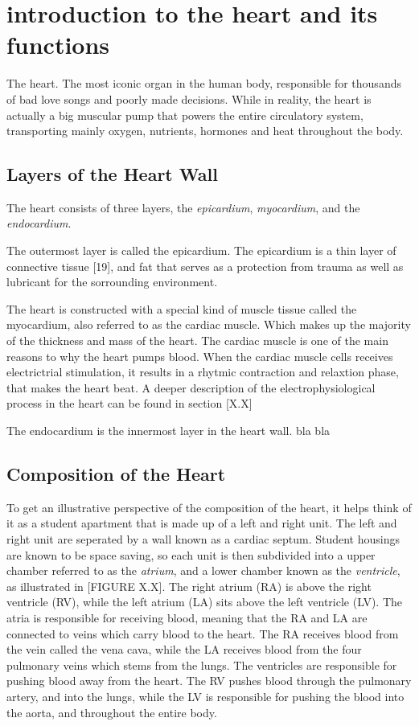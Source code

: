 \section{introduction to the heart and its functions}
The heart. The most iconic organ in the human body, responsible for thousands of bad love songs and poorly made decisions. While in reality, the heart is actually a big muscular pump that powers the entire circulatory system, transporting mainly oxygen, nutrients, hormones and heat throughout the body. 

\subsection{Layers of the Heart Wall}
The heart consists of three layers, the \textit{epicardium}, \textit{myocardium}, and the \textit{endocardium}. 

The outermost layer is called the epicardium. The epicardium is a thin layer of connective tissue [19], and fat that serves as a protection from trauma as well as lubricant for the sorrounding environment. 

The heart is constructed with a special kind of muscle tissue called the myocardium, also referred to as the cardiac muscle. Which makes up the majority of the thickness and mass of the heart. The cardiac muscle is one of the main reasons to why the heart pumps blood. When the cardiac muscle cells receives electrictrial stimulation, it results in a rhytmic contraction and relaxtion phase, that makes the heart beat. A deeper description of the electrophysiological process in the heart can be found in section [X.X]

The endocardium is the innermost layer in the heart wall. bla bla


\subsection{Composition of the Heart}
To get an illustrative perspective of the composition of the heart, it helps think of it as a student apartment that is made up of a left and right unit. The left and right unit are seperated by a wall known as a cardiac septum. Student housings are known to be space saving, so each unit is then subdivided into a upper chamber referred to as the \textit{atrium}, and a lower chamber known as the \textit{ventricle}, as illustrated in [FIGURE X.X]. The right atrium (RA) is above the right ventricle (RV), while the left atrium (LA) sits above the left ventricle (LV). The atria is responsible for receiving blood, meaning that the RA and LA are connected to veins which carry blood to the heart. The RA receives blood from the vein called the vena cava, while the LA receives blood from the four pulmonary veins which stems from the lungs. The ventricles are responsible for pushing blood away from the heart. The RV pushes blood through the pulmonary artery, and into the lungs, while the LV is responsible for pushing the blood into the aorta, and throughout the entire body.

